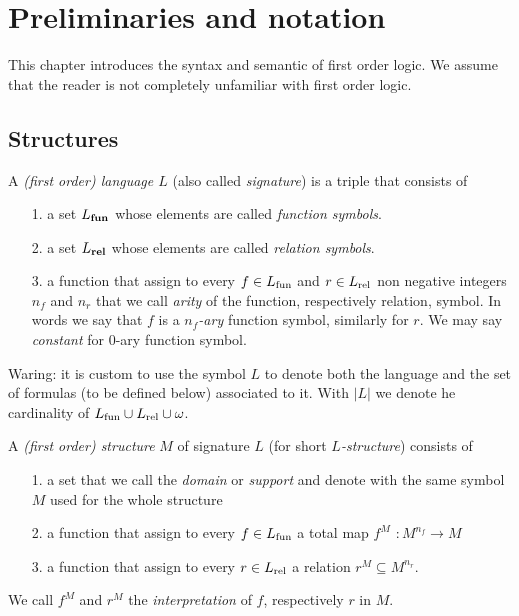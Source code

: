 \chapter{Preliminaries and notation}\label{termini}
This chapter introduces the syntax and semantic of first order logic. We assume that the reader is not completely unfamiliar with first order logic. 


\section{Structures}

A \emph{(first order) language $L$\/}  (also called \emph{signature\/}) is a triple that consists of

\begin{itemize}
\item[1.] a set \emph{$L_{\rm\bf fun}$} whose elements are called \emph{function symbols}.
\item[2.] a set \emph{$L_{\rm\bf rel}$\/} whose elements are called \emph{relation symbols}.
\item[3.] a function that assign to every $f\in L_{\rm fun}$ and $r\in L_{\rm rel}$ non negative integers $n_f$ and $n_r$ that we call \emph{arity\/} of the function, respectively relation, symbol. In words we say that $f$ is a \emph{$n_f$-ary} function symbol, similarly for $r$. We may say \emph{constant\/} for $0$-ary function symbol.
\end{itemize}

Waring: it is custom to use the symbol \emph{$L$} to denote both the language and the set of formulas (to be defined below) associated to it. With \emph{$|L|$} we denote he cardinality of $L_{\rm fun}\cup L_{\rm rel}\cup\omega$.


A \emph{(first order) structure\/} $M$ of signature $L$ (for short \emph{$L$-structure}) consists of

\begin{itemize}
\item[1.] a set that we call the \emph{domain\/} or \emph{support} and denote with the same symbol $M$ used for the whole structure
\item[2.] a function that assign to every $f\in L_{\rm fun}$ a total map \emph{$f^M$ $: M^{n_f}\to M$} 
\item[3.]a function that assign to every  $r\in L_{\rm rel}$ a relation \emph{$r^M\subseteq M^{n_r}$}.
\end{itemize}
 We call $f^M$ and $r^M$ the \emph{interpretation\/} of $f$, respectively $r$ in $M$.
 
